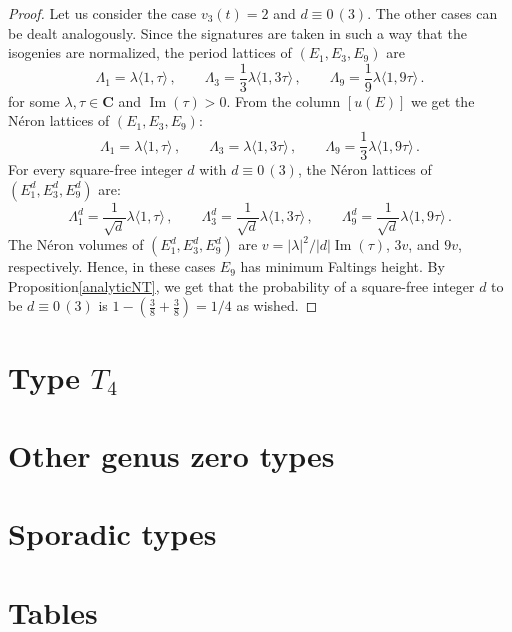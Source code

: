 \documentclass{ws-ijnt}
\begin{document}
\begin{proof}
Let us consider the case $v_3(t)=2$ and $d\equiv 0 \, (3)$. The other cases can be dealt analogously. Since the signatures are taken in such a way that the isogenies are normalized,  the period lattices of $(E_1,E_3,E_9)$
are
\begin{equation}
\displaystyle{
\Lambda_1 = \lambda \langle 1, \tau \rangle \,,\qquad
\Lambda_3 = \frac{1}{3}\lambda \langle 1, 3\tau \rangle \,,\qquad
\Lambda_9 = \frac{1}{9} \lambda \langle 1, 9\tau \rangle \,.}   
\end{equation}
for some $\lambda,\tau\in \mathbf{C}$ and $\operatorname{Im}(\tau)>0$. 
From the column $[u(E)]$ 
we get the Néron lattices of $(E_1,E_3,E_9)$:
\begin{equation}
\displaystyle{
\Lambda_1 = \lambda \langle 1, \tau \rangle \,,\qquad
\Lambda_3 = \lambda \langle 1, 3\tau \rangle \,,\qquad
\Lambda_9 = \frac{1}{3} \lambda \langle 1, 9\tau \rangle \,.}   
\end{equation}
For every square-free integer $d$ with $d\equiv 0 \, (3)$, the Néron
lattices of $(E_1^d,E_3^d,E_9^d)$ are:
\begin{equation}
\displaystyle{
\Lambda_1^d = \frac{1}{\sqrt{d}} \lambda \langle 1, \tau \rangle \,,\qquad
\Lambda_3^d = \frac{1}{\sqrt{d}}  \lambda \langle 1, 3\tau \rangle \,,\qquad
\Lambda_9^d = \frac{1}{\sqrt{d}} \lambda \langle 1, 9\tau \rangle \,.}   
\end{equation}
The Néron volumes of $(E_1^d,E_3^d,E_9^d)$ are 
$v = |\lambda|^2/|d| \operatorname{Im}(\tau)$, $3v$, and $9v$, respectively. Hence, in these cases $E_9$ has minimum Faltings height. By Proposition\ref{analyticNT}, we get that
the probability of a square-free integer $d$ to be $d\equiv 0 \, (3)$ is $1-(\frac{3}{8}+\frac{3}{8})= 1/4$ as wished.
\end{proof} 

\section{Type $T_4$}

\section{Other genus zero types}

\section{Sporadic types}

\section{Tables}
\end{document}
